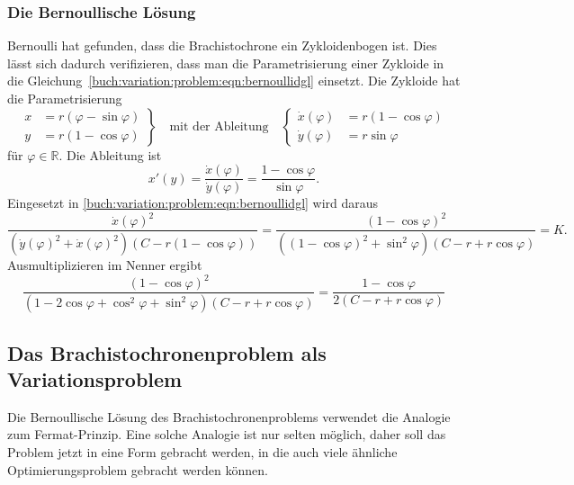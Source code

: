 \subsubsection{Die Bernoullische Lösung}
Bernoulli hat gefunden, dass die Brachistochrone ein Zykloidenbogen ist.
Dies lässt sich dadurch verifizieren, dass man die Parametrisierung
einer Zykloide in die
Gleichung~\eqref{buch:variation:problem:eqn:bernoullidgl}
einsetzt.
Die Zykloide hat die Parametrisierung
\[
\left.
\begin{aligned}
x &= r(\varphi - \sin\varphi) 
\\
y &= r(1-\cos\varphi)
\end{aligned}
\right\}
\quad
\text{mit der Ableitung}
\quad
\left\{
\begin{aligned}
\dot{x}(\varphi) &= r(1-\cos\varphi)\\
\dot{y}(\varphi) &= r\sin\varphi
\end{aligned}
\right.
\]
für $\varphi\in\mathbb{R}$.
Die Ableitung ist
\[
x'(y)
=
\frac{\dot{x}(\varphi)}{\dot{y}(\varphi)}
=
\frac{1-\cos\varphi}{\sin\varphi}.
\]
Eingesetzt in \eqref{buch:variation:problem:eqn:bernoullidgl}
wird daraus
\[
\frac{\dot{x}(\varphi)^2}{
(\dot{y}(\varphi)^2 +\dot{x}(\varphi)^2)
(C-r(1-\cos\varphi))
}
=
\frac{(1-\cos\varphi)^2}{
((1-\cos\varphi)^2+\sin^2\varphi)
(C-r+r\cos\varphi)
}
=
K.
\]
Ausmultiplizieren im Nenner ergibt
\[
\frac{(1-\cos\varphi)^2}{
(1-2\cos\varphi+\cos^2\varphi+\sin^2\varphi)
(C-r+r\cos\varphi)
}
=
\frac{1-\cos\varphi}{
2(C-r+r\cos\varphi)
}
\]

%
%
\subsection{Das Brachistochronenproblem als Variationsproblem
\label{buch:variation:problem:subsection:variationsproblem}}
Die Bernoullische Lösung des Brachistochronenproblems verwendet die
Analogie zum Fermat-Prinzip.
Eine solche Analogie ist nur selten möglich, daher soll das Problem
jetzt in eine Form gebracht werden, in die auch viele ähnliche
Optimierungsproblem gebracht werden können.

